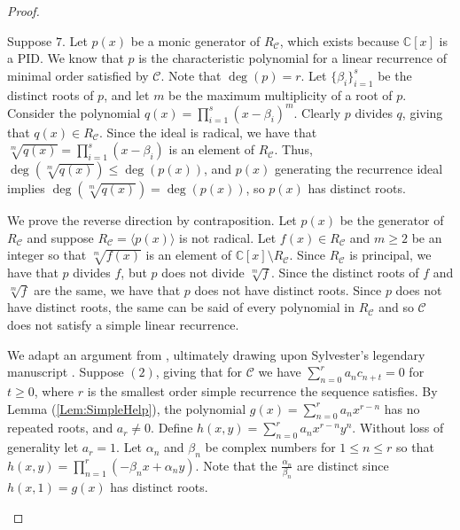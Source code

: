 \documentclass[12pt,reqno]{article}
\begin{document}
\begin{proof}
\hfill
\begin{description}
\item[$2 \Leftrightarrow 7$:] Suppose $7$. Let $p(x)$ be a monic generator of $R_{\mathcal{C}}$, which exists because $\mathbb{C}[x]$ is a PID. We know that $p$ is the characteristic polynomial for a linear recurrence of minimal order satisfied by $\mathcal{C}$. Note that $\deg(p) = r$. Let $\{\beta_i\}_{i=1}^s$ be the distinct roots of $p$, and let $m$ be the maximum multiplicity of a root of $p$. Consider the polynomial $q(x) = \prod_{i=1}^s (x - \beta_i)^m$. Clearly $p$ divides $q$, giving that $q(x)\in R_{\mathcal{C}}$. Since the ideal is radical, we have that $\sqrt[m]{q(x)} = \prod_{i=1}^s (x-\beta_i)$ is an element of $R_{\mathcal{C}}$. Thus, $\deg(\sqrt[m]{q(x)}) \leq \deg(p(x))$, and $p(x)$ generating the recurrence ideal implies $\deg(\sqrt[m]{q(x)}) = \deg(p(x))$, so $p(x)$ has distinct roots. 


\item We prove the reverse direction by contraposition. Let $p(x)$ be the generator of $ R_{\mathcal{C}}$ and suppose $R_{\mathcal{C}} = \langle p(x) \rangle$ is not radical. Let $f(x)\in R_{\mathcal{C}}$ and $m \geq 2$ be an integer so that $\sqrt[m]{f(x)}$ is an element of $\mathbb{C}[x]\setminus R_{\mathcal{C}}$. Since $R_{\mathcal{C}}$ is principal, we have that $p$ divides $f$, but $p$ does not divide $\sqrt[m]{f}$. Since the distinct roots of $f$ and $\sqrt[m]{f}$ are the same, we have that $p$ does not have distinct roots. Since $p$ does not have distinct roots, the same can be said of every polynomial in $R_{\mathcal{C}}$ and so $\mathcal{C}$ does not satisfy a simple linear recurrence. 


\item[$2 \Rightarrow 5 \Rightarrow 4$:] We adapt an argument from \cite{Rez2013}, ultimately drawing upon Sylvester's legendary manuscript \cite{Syl1851}.  Suppose $(2)$, giving that for $\mathcal{C}$ we have $\sum_{n=0}^r a_n c_{n+t} = 0$ for $t\geq0$, where $r$ is the smallest order simple recurrence the sequence satisfies. By Lemma (\ref{Lem:SimpleHelp}), the polynomial $g(x) = \sum_{n=0}^r a_n x^{r-n}$ has no repeated roots, and $a_r\neq 0$. Define $h(x,y) = \sum_{n=0}^r a_nx^{r-n}y^{n}$. Without loss of generality let $a_r = 1$. Let $\alpha_n$ and $\beta_n$ be complex numbers for $1\leq n\leq r$ so that $h(x,y) = \prod_{n=1}^r (-\beta_n x+\alpha_n y)$. Note that the $\frac{\alpha_n}{\beta_n}$ are distinct since $h(x,1) = g(x)$ has distinct roots. 


\end{description}
\end{proof}
\end{document}
